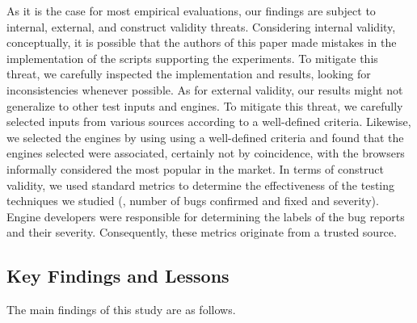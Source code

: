 \documentclass[smallextended]{svjour3}
\begin{document}
As it is the case for most empirical evaluations, our findings are
subject to internal, external, and construct validity
threats. Considering internal validity, conceptually, it is possible
that the authors of this paper made mistakes in the implementation of
the scripts supporting the experiments. To mitigate this threat, we
carefully inspected the implementation and results, looking for
inconsistencies whenever possible. As for external validity, our
results might not generalize to other test inputs and engines. To
mitigate this threat, we carefully selected inputs from various
sources according to a well-defined criteria. Likewise, we selected
the engines by using using a well-defined criteria and found that the
engines selected were associated, certainly not by coincidence, with
the browsers informally considered the most popular in the market.
In
terms of construct validity, we used standard metrics to determine the
effectiveness of the testing techniques we studied (\eg{}, number of
bugs confirmed and fixed and severity). Engine developers were
responsible for determining the labels of the bug reports and their
severity. Consequently, these metrics originate from a trusted source.


\subsection{Key Findings and Lessons}
\label{sec:lessons}

The main findings of this study are as follows.
\end{document}
